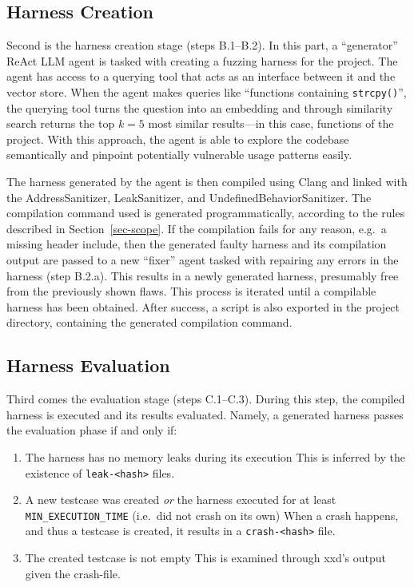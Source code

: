 \documentclass[
  a4paper,
  DIV=11,
  numbers=noendperiod]{scrreprt}
\providecommand{\tightlist}{%
  \setlength{\itemsep}{0pt}\setlength{\parskip}{0pt}}
\theoremstyle{definition}
\theoremstyle{remark}
\begin{document}
\subsection{Harness Creation}\label{sec-creation}

Second is the harness creation stage (steps B.1--B.2). In this part, a
``generator'' ReAct LLM agent is tasked with creating a fuzzing harness
for the project. The agent has access to a querying tool that acts as an
interface between it and the vector store. When the agent makes queries
like ``functions containing \texttt{strcpy()}'', the querying tool turns
the question into an embedding and through similarity search returns the
top \(k=5\) most similar results---in this case, functions of the
project. With this approach, the agent is able to explore the codebase
semantically and pinpoint potentially vulnerable usage patterns easily.

The harness generated by the agent is then compiled using Clang and
linked with the AddressSanitizer, LeakSanitizer, and
UndefinedBehaviorSanitizer. The compilation command used is generated
programmatically, according to the rules described in
Section~\ref{sec-scope}. If the compilation fails for any reason, e.g.~a
missing header include, then the generated faulty harness and its
compilation output are passed to a new ``fixer'' agent tasked with
repairing any errors in the harness (step B.2.a). This results in a
newly generated harness, presumably free from the previously shown
flaws. This process is iterated until a compilable harness has been
obtained. After success, a script is also exported in the project
directory, containing the generated compilation command.

\subsection{Harness Evaluation}\label{sec-evaluation}

Third comes the evaluation stage (steps C.1--C.3). During this step, the
compiled harness is executed and its results evaluated. Namely, a
generated harness passes the evaluation phase if and only if:

\begin{enumerate}
\def\labelenumi{\arabic{enumi}.}
\tightlist
\item
  The harness has no memory leaks during its execution This is inferred
  by the existence of \texttt{leak-\textless{}hash\textgreater{}} files.
\item
  A new testcase was created \emph{or} the harness executed for at least
  \texttt{MIN\_EXECUTION\_TIME} (i.e.~did not crash on its own) When a
  crash happens, and thus a testcase is created, it results in a
  \texttt{crash-\textless{}hash\textgreater{}} file.
\item
  The created testcase is not empty This is examined through xxd's
  output given the crash-file.
\end{enumerate}
\end{document}
